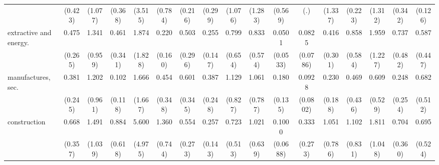 {\begin{tabular}{l*{16}{c}}
                    &     (0.423)         &     (1.077)         &     (0.368)         &     (3.515)         &     (0.784)         &     (0.216)         &     (0.299)         &     (1.076)         &     (1.283)         &     (0.569)         &         (.)         &     (1.337)         &     (0.223)         &     (1.312)         &     (0.342)         &     (0.126)         \\
[1em]
extractive and energy.&       0.475         &       1.341         &       0.461         &       1.874         &       0.220\sym{*}  &       0.503         &       0.255\sym{*}  &       0.799         &       0.833         &      0.0501\sym{**} &      0.0825\sym{**} &       0.416         &       0.858         &       1.959         &       0.737         &       0.587         \\
                    &     (0.265)         &     (0.959)         &     (0.341)         &     (1.828)         &     (0.160)         &     (0.296)         &     (0.147)         &     (0.654)         &     (0.574)         &    (0.0533)         &    (0.0786)         &     (0.301)         &     (0.584)         &     (1.227)         &     (0.482)         &     (0.447)         \\
[1em]
manufactures, sec.  &       0.381         &       1.202         &       0.102\sym{*}  &       1.666         &       0.454         &       0.601         &       0.387         &       1.129         &       1.061         &       0.180\sym{*}  &      0.0928\sym{**} &       0.230         &       0.469         &       0.609         &       0.248         &       0.682         \\
                    &     (0.245)         &     (0.961)         &     (0.118)         &     (1.667)         &     (0.348)         &     (0.345)         &     (0.248)         &     (0.827)         &     (0.787)         &     (0.135)         &    (0.0802)         &     (0.188)         &     (0.436)         &     (0.529)         &     (0.254)         &     (0.512)         \\
[1em]
construction        &       0.668         &       1.491         &       0.884         &       5.600         &       1.360         &       0.554         &       0.257\sym{*}  &       0.723         &       1.021         &      0.1000\sym{***}&       0.333         &       1.051         &       1.102         &       1.811         &       0.704         &       0.695         \\
                    &     (0.357)         &     (1.039)         &     (0.618)         &     (4.975)         &     (0.744)         &     (0.273)         &     (0.143)         &     (0.513)         &     (0.639)         &    (0.0688)         &     (0.273)         &     (0.786)         &     (0.831)         &     (1.048)         &     (0.360)         &     (0.524)         \\

\end{tabular}}
